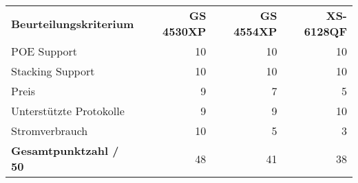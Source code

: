 \begin{tabularx}{\textwidth}{Xrrr}
    \rowcolor{heading}\textbf{Beurteilungskriterium} & \textbf{GS 4530XP} & \textbf{GS 4554XP} & \textbf{XS-6128QF} \\
    POE Support & 10 & 10 & 10 \\
    \rowcolor{odd}Stacking Support & 10 & 10 & 10 \\
    Preis & 9 & 7 & 5 \\
    \rowcolor{odd}Unterstützte Protokolle & 9 & 9 & 10 \\
    Stromverbrauch & 10 & 5 & 3 \\
    \hline
    \hline
    \rowcolor{heading}\textbf{Gesamtpunktzahl / 50} & 48 & 41 & 38 \\
    \end{tabularx}